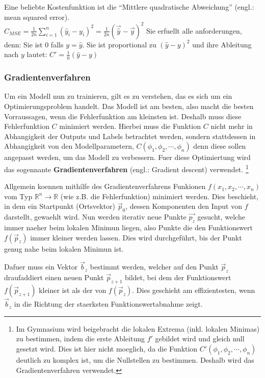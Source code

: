 \documentclass[../main]{subfiles}
\begin{document}
Eine beliebte Kostenfunktion ist die ``Mittlere quadratische Abweichung'' (engl.: mean squared error).\\
$\displaystyle C_{MSE} = \frac{1}{2n}\sum_{i=1}^{n}(\hat{y}_i - y_i)^2 = \frac{1}{2n}(\vec{\hat{y}} - \vec{y})^2$
Sie erfuellt alle anforderungen, denn:
Sie ist $0$ falls $y=\hat{y}$. Sie ist proportional zu $(\hat{y}-y)^2$ und ihre Ableitung nach $y$ lautet: $C'=\frac{1}{n}(\hat{y}-y)$


\subsubsection{Gradientenverfahren}
Um ein Modell nun zu trainieren, gilt es zu verstehen, das es sich um ein Optimierungsproblem handelt.
Das Modell ist am besten, also macht die besten Vorraussagen, wenn die Fehlerfunktion am kleinsten ist.
Deshalb muss diese Fehlerfunktion $C$ minimiert werden.
Hierbei muss die Funktion $C$ nicht mehr in Abhangigkeit der Outputs und Labels betrachtet werden, sondern stattdessen in Abhangigkeit von den Modellparametern,
$C(\phi_1, \phi_2, \cdots, \phi_n)$ denn diese sollen angepasst werden, um das Modell zu verbessern.
Fuer diese Optimiertung wird das sogennante \textbf{Gradientenverfahren} (engl.: Gradient descent) verwendet.
\footnote{
    Im Gymnasium wird beigebracht die lokalen Extrema (inkl. lokalen Minimas) zu bestimmen, indem die erste Ableitung $f'$ gebildet wird und  gleich null gesetzt wird.
    Dies ist hier nicht moeglich, da die Funktion $C'(\phi_1,\phi_2, \cdots, \phi_n)$ deutlich zu komplex ist, um die Nullstellen zu bestimmen. Deshalb wird das Gradientenverfahren verwendet.
}\par
\medskip
Allgemein koennen mithilfe des Gradientenverfahrens Funkionen $f(x_1, x_2, \cdots, x_n)$ vom Typ $\mathbb{R}^n \to \mathbb{R}$ (wie z.B. die Fehlerfunktion) minimiert werden.
Dies beschieht, in dem ein Startpunkt (Ortsvektor) $\vec{p}_0$, dessen Komponenten den Input von $f$ darstellt, gewaehlt wird.
Nun werden iterativ neue Punkte $\vec{p_z}$ gesucht, welche immer naeher beim lokalen Minimun liegen, also Punkte die den Funktionswert $f(\vec{p}_z)$ immer kleiner werden lassen.
Dies wird durchgeführt, bis der Punkt genug nahe beim lokalen Minimun ist.
\par
\medskip
Dafuer muss ein Vektor $\vec{b}_z$ bestimmt werden, welcher auf den Punkt $\vec{p}_z$ draufaddiert einen neuen Punkt $\vec{p}_{z+1}$ bildet,
bei dem der Funktionswert $f(\vec{p}_{z+1})$ kleiner ist als der von $f(\vec{p}_z)$.
Dies geschieht am effizientesten, wenn $\vec{b}_z$ in die Richtung der staerksten Funktionswertabnahme zeigt.
\end{document}
